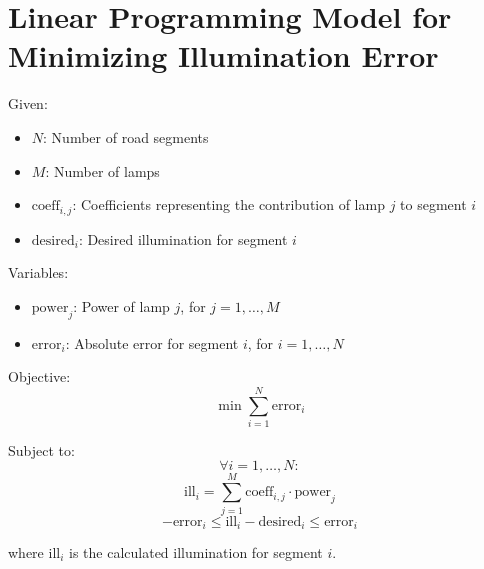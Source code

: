 \documentclass{article}
\begin{document}
\section*{Linear Programming Model for Minimizing Illumination Error}

Given:
\begin{itemize}
    \item $N$: Number of road segments
    \item $M$: Number of lamps
    \item $\text{coeff}_{i,j}$: Coefficients representing the contribution of lamp $j$ to segment $i$
    \item $\text{desired}_i$: Desired illumination for segment $i$
\end{itemize}

Variables:
\begin{itemize}
    \item $\text{power}_j$: Power of lamp $j$, for $j = 1, \ldots, M$
    \item $\text{error}_i$: Absolute error for segment $i$, for $i = 1, \ldots, N$
\end{itemize}

Objective:
\[
\min \sum_{i=1}^{N} \text{error}_i
\]

Subject to:
\[
\forall i = 1, \ldots, N:
\]
\[
\text{ill}_i = \sum_{j=1}^{M} \text{coeff}_{i,j} \cdot \text{power}_j
\]
\[
-\text{error}_i \leq \text{ill}_i - \text{desired}_i \leq \text{error}_i
\]

where $\text{ill}_i$ is the calculated illumination for segment $i$.
\end{document}

